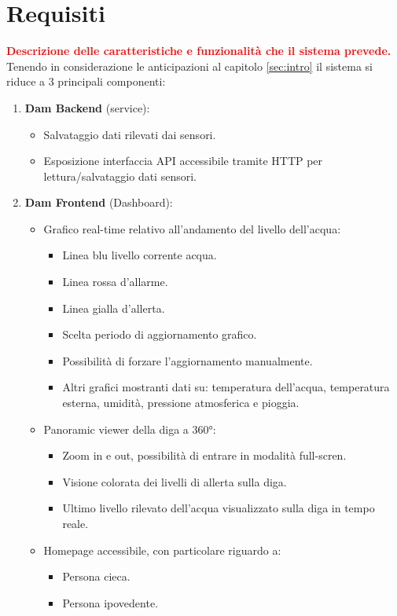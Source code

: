 \documentclass{report}
\begin{document}
\section{Requisiti}
\textcolor{red}{\textbf{Descrizione delle caratteristiche e funzionalità che il sistema prevede.}} %
Tenendo in considerazione le anticipazioni al capitolo \ref{sec:intro} il sistema si riduce a 3 principali componenti:
\begin{enumerate}
	\item \textbf{Dam Backend} (service):
	\begin{itemize}
		\item Salvataggio dati rilevati dai sensori.
		\item Esposizione interfaccia API accessibile tramite HTTP per lettura/salvataggio dati sensori.
	\end{itemize} 
	\item \textbf{Dam Frontend} (Dashboard):
	\begin{itemize}
		\item Grafico real-time relativo all'andamento del livello dell'acqua:
		\begin{itemize}
			\item Linea blu livello corrente acqua.
			\item Linea rossa d'allarme.
			\item Linea gialla d'allerta.
			\item Scelta periodo di aggiornamento grafico.
			\item Possibilità di forzare l'aggiornamento manualmente.
			\item Altri grafici mostranti dati su: temperatura dell'acqua, temperatura esterna, umidità, pressione atmosferica e pioggia.
		\end{itemize}
		\item Panoramic viewer della diga a 360°:
		\begin{itemize}
			\item Zoom in e out, possibilità di entrare in modalità full-scren.
			\item Visione colorata dei livelli di allerta sulla diga.
			\item Ultimo livello rilevato dell'acqua visualizzato sulla diga in tempo reale.
		\end{itemize}
		\item Homepage accessibile, con particolare riguardo a:
		\begin{itemize}
			\item Persona cieca.
			\item Persona ipovedente.

\end{itemize}
\end{itemize}
\end{enumerate}
\end{document}
